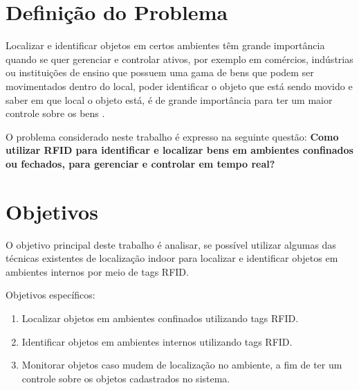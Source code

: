 \section{Definição do Problema}

Localizar e identificar objetos em certos ambientes têm grande importância quando se quer gerenciar e controlar ativos, por exemplo em comércios, indústrias ou instituições de ensino que possuem uma gama de bens que podem ser movimentados dentro do local,  poder identificar o objeto que está sendo movido e saber em que local o objeto está, é de grande importância para ter um maior controle sobre os bens \cite{realtimeRFID2016}. 

\par
O problema considerado neste trabalho é expresso na seguinte questão: \textbf{ Como utilizar RFID para identificar e localizar bens em ambientes confinados ou fechados, para gerenciar e controlar em tempo real?}
\section{Objetivos}
O objetivo principal deste trabalho é analisar, se possível utilizar algumas das técnicas existentes de localização indoor para localizar e identificar objetos em ambientes internos por meio de tags RFID.
\par
Objetivos específicos:
\begin{enumerate}

    \item Localizar objetos em ambientes confinados utilizando tags RFID.
    
    \item Identificar objetos em ambientes internos utilizando tags RFID.
    
    \item Monitorar objetos caso mudem de localização no ambiente, a fim de ter um controle sobre os objetos cadastrados no sistema.
    
\end{enumerate}


